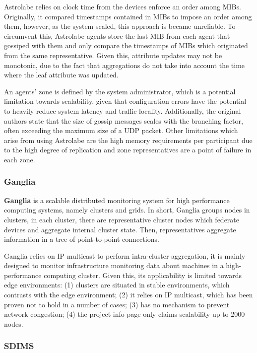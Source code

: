 Astrolabe relies on clock time from the devices enforce an order among MIBs. Originally, it compared timestamps contained in MIBs to impose an order among them, however, as the system scaled, this approach is became unreliable. To circumvent this, Astrolabe agents store the last MIB from each agent that gossiped with them and only compare the timestamps of MIBs which originated from the same representative. Given this, attribute updates may not be monotonic, due to the fact that aggregations do not take into account the time where the leaf attribute was updated. 

An agents' zone is defined by the system administrator, which is a potential limitation towards scalability, given that configuration errors have the potential to heavily reduce system latency and traffic locality. Additionally, the original authors state that the size of gossip messages scales with the branching factor, often exceeding the maximum size of a UDP packet. Other limitations which arise from using Astrolabe are the high memory requirements per participant due to the high degree of replication and zone representatives are a point of failure in each zone. 

\subsubsection{Ganglia}

\textbf{Ganglia} \cite{massie2004ganglia} is a scalable distributed monitoring system for high performance computing systems, namely clusters and grids. In short, Ganglia groups nodes in clusters, in each cluster, there are representative cluster nodes which federate devices and aggregate internal cluster state. Then, representatives aggregate information in a tree of point-to-point connections.

Ganglia relies on IP multicast to perform intra-cluster aggregation, it is mainly designed to monitor infrastructure monitoring data about machines in a high-performance computing cluster. Given this, its applicability is limited towards edge environments: (1) clusters are situated in stable environments, which contrasts with the edge environment; (2) it relies on IP multicast, which has been proven not to hold in a number of cases; (3) has no mechanism to prevent network congestion; (4) the project info page only claims scalability up to 2000 nodes.

\subsubsection{SDIMS}

